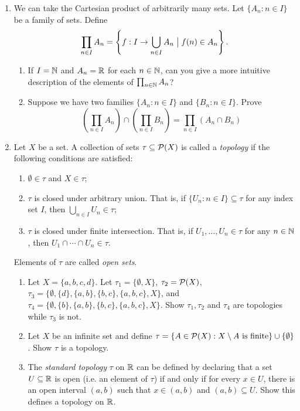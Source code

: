 \begin{exercises}{}{}
\begin{enumerate}
\item We can take the Cartesian product of arbitrarily many sets. Let $\{A_n : n \in I\}$ be a family of sets. Define
\[
\prod_{n \in I} A_n = \left\{f : I \to \bigcup_{n \in I} A_n \bigm| f(n) \in A_n\right\}.
\]
\begin{enumerate}
    \item If $I = \mathbb{N}$ and $A_n = \mathbb{R}$ for each $n \in \mathbb{N}$, can you give a more intuitive description of the elements of $\prod_{n \in \mathbb{N}} A_n$?
    \item Suppose we have two families $\{A_n : n \in I\}$ and $\{B_n : n \in I\}$. Prove
    \[
        \left(\prod_{n \in I} A_n \right) \cap \left(\prod_{n \in I} B_n \right) = \prod_{n \in I} (A_n \cap B_n)
    \]
\end{enumerate}

	\item Let $X$ be a set. A collection of sets $\tau \subseteq \mathcal{P}(X)$ is called a \emph{topology} if the following conditions are satisfied:
\begin{enumerate}
    \item $\emptyset \in \tau$ and $X \in \tau$;
    \item $\tau$ is closed under arbitrary union. That is, if $\{U_n : n \in I\} \subseteq \tau$ for any index set $I$, then $\bigcup_{n \in I} U_n \in \tau$;
    \item $\tau$ is closed under finite intersection. That is, if $U_1,\ldots,U_n \in \tau$ for any $n \in \mathbb{N}$, then $U_1 \cap \cdots \cap U_n \in \tau$.
\end{enumerate}
Elements of $\tau$ are called \emph{open sets}.
\begin{enumerate}
    \item Let $X = \{a,b,c,d\}$. Let $\tau_1 = \{\emptyset, X\}$, $\tau_2 = \mathcal{P}(X)$, $\tau_3 = \{\emptyset, \{d\}, \{a,b\}, \{b,c\}, \{a,b,c\}, X\}$, and $\tau_4 = \{\emptyset, \{b\}, \{a,b\}, \{b,c\}, \{a,b,c\}, X\}$. Show $\tau_1,\tau_2$ and $\tau_4$ are topologies while $\tau_3$ is not.
    
    \item Let $X$ be an infinite set and define $\tau = \{A \in \mathcal{P}(X) : X \setminus A \text{ is finite}\} \cup \{\emptyset\}$. Show $\tau$ is a topology.
    \item The \emph{standard topology} $\tau$ on $\mathbb{R}$ can be defined by declaring that a set $U \subseteq \mathbb{R}$ is open (i.e. an element of $\tau$) if and only if for every $x \in U$, there is an open interval $(a,b)$ such that $x \in (a,b)$ and $(a,b) \subseteq U$. Show this defines a topology on $\mathbb{R}$.
\end{enumerate}


\end{enumerate}
\end{exercises}
